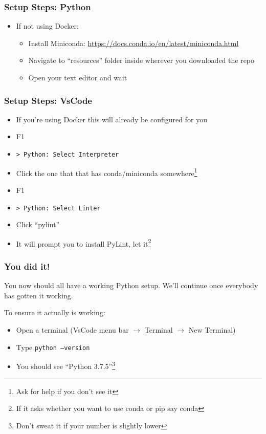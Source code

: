 \documentclass[aspectratio=169]{beamer}
\begin{document}
\begin{frame}
  \frametitle{Setup Steps: Python}

  \begin{itemize}
    \item If not using Docker:
      \begin{itemize}
        \item Install Miniconda: \url{https://docs.conda.io/en/latest/miniconda.html}
        \item Navigate to ``resources'' folder inside wherever you downloaded
              the repo
        \item Open your text editor and wait
      \end{itemize}
  \end{itemize}
\end{frame}
\begin{frame}
  \frametitle{Setup Steps: VsCode}
  \begin{itemize}
    \item If you're using Docker this will already be configured for you
    \item F1
    \item \texttt{> Python: Select Interpreter}
    \item Click the one that that has conda/miniconda somewhere\footnote{Ask for help if you don't see it}
    \item F1
    \item \texttt{> Python: Select Linter}
    \item Click ``pylint''
    \item It will prompt you to install PyLint, let it\footnote{If it asks
          whether you want to use conda or pip say conda}
  \end{itemize}
\end{frame}
\begin{frame}
  \frametitle{You did it!}
  You now should all have a working Python setup.  We'll continue once
  everybody has gotten it working.

  \vspace{24pt}
  To ensure it actually is working:
  \begin{itemize}
    \item Open a terminal (VsCode menu bar $\rightarrow$ Terminal $\rightarrow$ New Terminal)
    \item Type \texttt{python --version}
    \item You should see ``Python 3.7.5''\footnote{Don't sweat it if your number is
    slightly lower}
  \end{itemize}
\end{frame}
\end{document}

